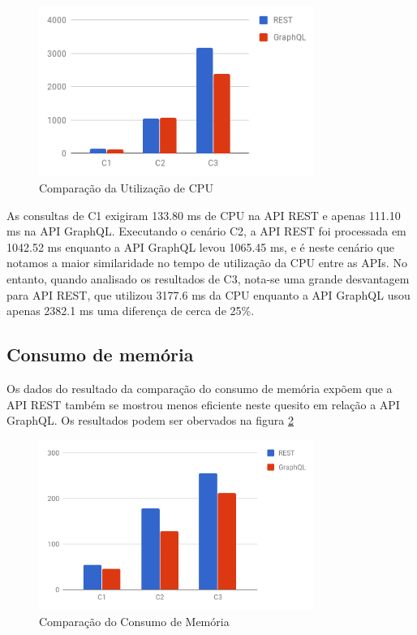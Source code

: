 \begin{figure}[htbp]
    \centering
    \includegraphics[width=0.8\textwidth]{figuras/q1-cpu.png}
    \caption{Comparação da Utilização de CPU}
    \label{fig:q1-cpu}
\end{figure}

As consultas de C1 exigiram 133.80 ms de CPU na API REST e apenas 111.10 ms na API GraphQL. Executando o cenário C2, a API REST foi processada em 1042.52 ms enquanto a API GraphQL levou 1065.45 ms, e é neste cenário que notamos a maior similaridade no tempo de utilização da CPU entre as APIs. No entanto, quando analisado os resultados de C3, nota-se uma grande desvantagem para API REST, que utilizou 3177.6 ms da CPU enquanto a API GraphQL usou apenas 2382.1 ms uma diferença de cerca de 25\%.
    
\subsection{Consumo de memória}

Os dados do resultado da comparação do consumo de memória expõem que a API REST também se mostrou menos eficiente neste quesito em relação a API GraphQL. Os resultados podem ser obervados na figura \ref{fig:q1-mem}

\begin{figure}[htbp]
    \centering
    \includegraphics[width=0.8\textwidth]{figuras/q1-memory.png}
    \caption{Comparação do Consumo de Memória}
    \label{fig:q1-mem}
\end{figure}

